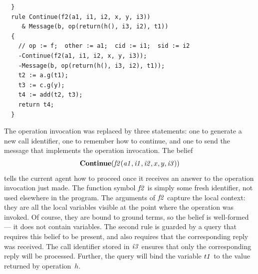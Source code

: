 \documentclass[a4paper,12pt,oneside,fleqn]{book} %
\begin{document}
{\begin{example}
\begin{verbatim}
  }
  rule Continue(f2(a1, i1, i2, x, y, i3))
     & Message(b, op(return(h(), i3, i2), t1))
  {
    // op := f;  other := a1;  cid := i1;  sid := i2
    -Continue(f2(a1, i1, i2, x, y, i3));
    -Message(b, op(return(h(), i3, i2), t1));
    t2 := a.g(t1);
    t3 := c.g(y);
    t4 := add(t2, t3);
    return t4;
  }
\end{verbatim}
The operation invocation was replaced by three statements: one to generate
a new call identifier, one to remember how to continue, and one to send the
message that implements the operation invocation. The belief
\begin{align}
  {\bf Continue}
    ({\it f2}({\it a1}, {\it i1}, {\it i2}, x, y, {\it i3}))
\end{align}
tells the current agent how to proceed once it receives an answer to the
operation invocation just made. The function symbol $\it f2$ is simply some
fresh identifier, not used elsewhere in the program. The arguments of $\it
f2$ capture the local context: they are all the local variables visible at
the point where the operation was invoked. Of course, they are bound to
ground terms, so the belief is well-formed --- it does not contain
variables. The second rule is guarded by a query that requires this belief
to be present, and also requires that the corresponding reply was received.
The call identifier stored in $\it i3$ ensures that only the corresponding
reply will be processed. Further, the query will bind the variable $\it t1$
to the value returned by operation~$h$.


\end{example}}
\end{document}
